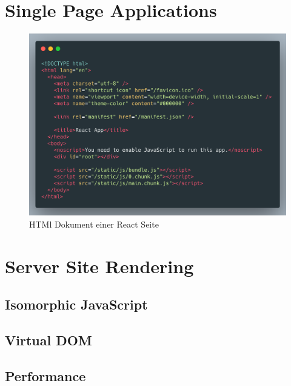 \documentclass[runningheads]{llncs}
\begin{document}
\section{Single Page Applications}
\label{sec:Single Page Applications}
\begin{figure}[h]
  \centering
  \includegraphics[width=12cm]{images/react-code}
  \caption{HTMl Dokument einer React Seite}
  \label{fig:iwilogo}
\end{figure}


\section{Server Site Rendering}
\label{sec:Server Site Rendering}

\subsection{Isomorphic JavaScript}
\label{subsec:Isomorphic JavaScript}

\subsection{Virtual DOM}
\label{subsec:Virtual DOM}

\subsection{Performance}
\label{subsec:Virtual DOM}
\end{document}
